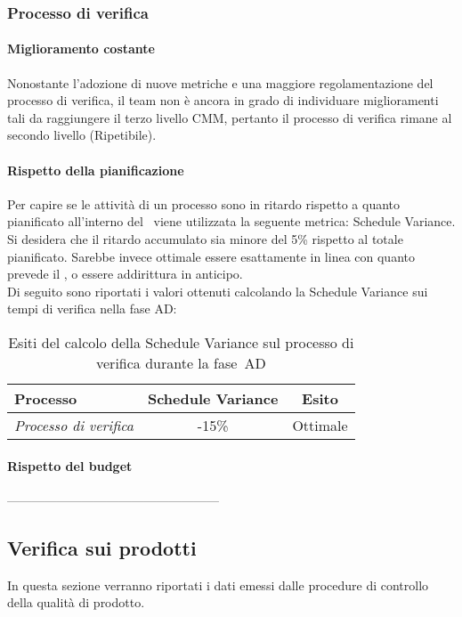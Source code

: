 \documentclass[../PianoDiQualifica.tex]{subfiles}
\begin{document}
\begin{appendices}
		\subsubsection{Processo di verifica}
			\paragraph{Miglioramento costante}
			Nonostante l'adozione di nuove metriche e una maggiore regolamentazione del processo di verifica, il team non è ancora in grado di individuare miglioramenti tali da raggiungere il terzo livello CMM, pertanto il processo di verifica rimane al secondo livello (Ripetibile).
			
			\paragraph{Rispetto della pianificazione}
			Per capire se le attività di un processo sono in ritardo rispetto a quanto pianificato all’interno del \pianodiprogetto\ viene utilizzata la seguente metrica: Schedule Variance.\\
			Si desidera che il ritardo accumulato sia minore del 5\% rispetto al totale pianificato. Sarebbe invece ottimale essere esattamente in linea con quanto prevede il \pianodiprogetto, o essere addirittura in anticipo.\\
			Di seguito sono riportati i valori ottenuti calcolando la Schedule Variance sui tempi di verifica nella fase AD:
			\begin{table}[H]
				\centering
				\begin{tabular}{l * {2}{c}}
					\toprule
					\textbf{Processo} & \textbf{Schedule Variance} & \textbf{Esito} \\
					\midrule
					\textit{Processo di verifica} & -15\% &  Ottimale \\
					\bottomrule
				\end{tabular}
				\caption{Esiti del calcolo della Schedule Variance sul processo di verifica durante la fase\g\ AD}
				\label{tab:esiti_schedule_variance}
			\end{table}
			
			\paragraph{Rispetto del budget}
			---------------------------------------------------
			
			
	\subsection{Verifica sui prodotti}
	In questa sezione verranno riportati i dati emessi dalle procedure di controllo della qualità di prodotto\g.

\end{appendices}
\end{document}
